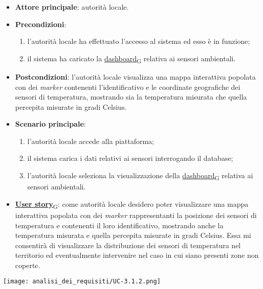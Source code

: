 \newpage
{}
\begin{itemize}
	\item \textbf{Attore principale}: autorità locale.
	\item \textbf{Precondizioni}:
	      \begin{enumerate}
		      \item l'autorità locale ha effettuato l'accesso al sistema ed esso è in funzione;
		      \item il sistema ha caricato la \href{https://7last.github.io/docs/pb/documentazione-interna/glossario\#dashboard}{dashboard\textsubscript{G}} relativa ai sensori ambientali.
	      \end{enumerate}
	\item \textbf{Postcondizioni}: l'autorità locale visualizza una mappa interattiva popolata con dei \textit{marker} contenenti l'identificativo e le coordinate geografiche dei sensori di temperatura, mostrando sia la temperatura misurata che quella percepita misurate in gradi Celsius.
	\item \textbf{Scenario principale}:
	      \begin{enumerate}
		      \item l'autorità locale accede alla piattaforma;
		      \item il sistema carica i dati relativi ai sensori interrogando il database;
		      \item l'autorità locale seleziona la visualizzazione della \href{https://7last.github.io/docs/pb/documentazione-interna/glossario\#dashboard}{dashboard\textsubscript{G}} relativa ai sensori ambientali.
	      \end{enumerate}
	\item \href{https://7last.github.io/docs/pb/documentazione-interna/glossario\#user-story}{\textbf{User story}\textsubscript{G}}:
	      come autorità locale desidero poter visualizzare una mappa interattiva popolata con dei \textit{marker} rappresentanti la posizione dei sensori di temperatura e contenenti il loro identificativo, mostrando anche la temperatura misurata e quella percepita misurate in gradi Celsius. Essa mi consentirà di visualizzare la distribuzione dei sensori di temperatura nel territorio ed eventualmente intervenire nel caso in cui siano presenti zone non coperte.
\end{itemize}
\begin{center}
	\texttt{[image: analisi\_dei\_requisiti/UC-3.1.2.png]}
\end{center}

